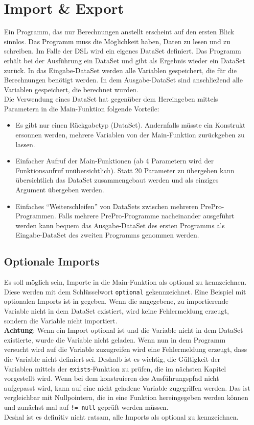 \section{Import \& Export}
\label{sec:Import}

Ein Programm, das nur Berechnungen anstellt erscheint auf den ersten Blick sinnlos.
Das Programm muss die Möglichkeit haben, Daten zu lesen und zu schreiben.
Im Falle der DSL wird ein eigenes DataSet definiert.
Das Programm erhält bei der Ausführung ein DataSet und gibt als Ergebnis wieder ein DataSet zurück.
In das Eingabe-DataSet werden alle Variablen gespeichert, die für die Berechnungen benötigt werden.
In dem Ausgabe-DataSet sind anschließend alle Variablen gespeichert, die berechnet wurden.\\
Die Verwendung eines DataSet hat gegenüber dem Hereingeben mittels Parametern in die Main-Funktion folgende Vorteile:
\begin{itemize}
\item Es gibt nur einen Rückgabetyp (DataSet).
Andernfalls müsste ein Konstrukt ersonnen werden, mehrere Variablen von der Main-Funktion zurückgeben zu lassen.
\item Einfacher Aufruf der Main-Funktionen (ab 4 Parametern wird der Funktionsaufruf unübersichtlich\cite{parameterCount}). Statt 20 Parameter zu übergeben kann übersichtlich das DataSet zusammengebaut werden und als einziges Argument übergeben werden.
\item Einfaches ``Weiterschleifen'' von DataSets zwischen mehreren PrePro-Programmen.
Falls mehrere PrePro-Programme nacheinander ausgeführt werden kann bequem das Ausgabe-DataSet des ersten Programms als Eingabe-DataSet des zweiten Programms genommen werden.
\end{itemize}

\subsection{Optionale Imports}
Es soll möglich sein, Importe in die Main-Funktion als optional zu kennzeichnen.
Diese werden mit dem Schlüsselwort \texttt{optional} gekennzeichnet.
Eine Beispiel mit optionalen Imports ist in  gegeben.
Wenn die angegebene, zu importierende Variable nicht in dem DataSet existiert, wird keine Fehlermeldung erzeugt, sondern die Variable nicht importiert.\\
\textbf{Achtung}: Wenn ein Import optional ist und die Variable nicht in dem DataSet existierte, wurde die Variable nicht geladen.
Wenn nun in dem Programm versucht wird auf die Variable zuzugreifen wird eine Fehlermeldung erzeugt, dass die Variable nicht definiert sei.
Deshalb ist es wichtig, die Gültigkeit der Variablen mittels der \texttt{exists}-Funktion zu prüfen, die im nächsten Kapitel vorgestellt wird.
Wenn bei dem konstruieren des Ausführungspfad nicht aufgepasst wird, kann auf eine nicht geladene Variable zugegriffen werden.
Das ist vergleichbar mit Nullpointern, die in eine Funktion hereingegeben werden können und zunächst mal auf \texttt{!= null} geprüft werden müssen.\\
Deshal ist es definitiv nicht ratsam, alle Imports als optional zu kennzeichnen.

